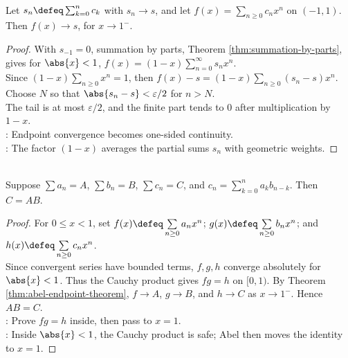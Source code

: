 \begin{theorem} \label{thm:abel-endpoint-theorem} \\
Let $s_n\defeq\sum_{k=0}^{n}c_k$ with $s_n\to s$, and let $f(x)=\sum_{n\ge0}c_nx^n$ on $(-1,1)$. Then $f(x)\to s$, for $x\to1^-$.
\begin{proof}
With $s_{-1}=0$, summation by parts, Theorem \ref{thm:summation-by-parts}, gives for $\abs{x}<1$, $f(x)=(1-x)\sum\limits_{n=0}^{\infty}s_nx^n$.\\
Since $(1-x)\sum\limits_{n\ge0}x^n=1$, then $f(x)-s=(1-x)\sum\limits_{n\ge0}(s_n-s)x^n$. Choose $N$ so that $\abs{s_n-s}<\varepsilon/2$ for $n>N$.\\
The tail is at most $\varepsilon/2$, and the finite part tends to $0$ after multiplication by $1-x$.\\
: Endpoint convergence becomes one-sided continuity.\\
: The factor $(1-x)$ averages the partial sums $s_n$ with geometric weights.
\end{proof}
\end{theorem}

\begin{theorem} \label{thm:abel-product-theorem} \\
Suppose $\sum a_n=A$, $\sum b_n=B$, $\sum c_n=C$, and $c_n=\sum\limits_{k=0}^{n}a_kb_{n-k}$. Then $C=AB$.
\begin{proof}
For $0\leq x<1$, set $f(x)\defeq\sum\limits_{n\ge0}a_nx^n$; $g(x)\defeq\sum\limits_{n\ge0}b_nx^n$; and $h(x)\defeq\sum\limits_{n\ge0}c_nx^n$.\\
Since convergent series have bounded terms, $f,g,h$ converge absolutely for $\abs{x}<1$. Thus the Cauchy product gives $fg=h$ on $[0,1)$. By Theorem \ref{thm:abel-endpoint-theorem}, $f\to A$, $g\to B$, and $h\to C$ as $x\to1^-$. Hence $AB=C$.\\
: Prove $fg=h$ inside, then pass to $x=1$.\\
: Inside $\abs{x}<1$, the Cauchy product is safe; Abel then moves the identity to $x=1$.
\end{proof}
\end{theorem}

